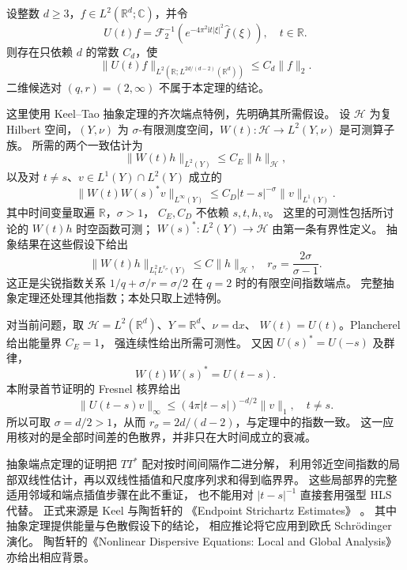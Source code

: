 \begin{theorem}\label{b2:thm:E-endpoint}
设整数 \(d\ge3\)，\(f\in L^2(\mathbb R^d;\mathbb C)\)，并令
\[
 U(t)f=\mathcal F_2^{-1}
       \left(e^{-4\pi^2\mathrm it|\xi|^2}\widehat f(\xi)\right),
 \quad t\in\mathbb R.
\]
则存在只依赖 \(d\) 的常数 \(C_d\)，使
\[
 \|U(t)f\|_{L^2(\mathbb R;L^{2d/(d-2)}(\mathbb R^d))}
 \le C_d\|f\|_2.
\]
二维候选对 \((q,r)=(2,\infty)\) 不属于本定理的结论。
\end{theorem}
\begin{proofsketch}
这里使用 Keel--Tao 抽象定理的齐次端点特例，先明确其所需假设。
设 \(\mathcal H\) 为复 Hilbert 空间，\((Y,\nu)\) 为
\(\sigma\)-有限测度空间，\(W(t):\mathcal H\to L^2(Y,\nu)\) 是可测算子族。
所需的两个一致估计为
\[
 \|W(t)h\|_{L^2(Y)}\le C_E\|h\|_{\mathcal H},
\]
以及对 \(t\ne s\)、\(v\in L^1(Y)\cap L^2(Y)\) 成立的
\[
 \|W(t)W(s)^*v\|_{L^\infty(Y)}
 \le C_D|t-s|^{-\sigma}\|v\|_{L^1(Y)}.
\]
其中时间变量取遍 \(\mathbb R\)，\(\sigma>1\)，
\(C_E,C_D\) 不依赖 \(s,t,h,v\)。
这里的可测性包括所讨论的 \(W(t)h\) 时空函数可测；
\(W(s)^*:L^2(Y)\to\mathcal H\) 由第一条有界性定义。
抽象结果在这些假设下给出
\[
 \|W(t)h\|_{L^2_tL^{r_\sigma}(Y)}
 \le C\|h\|_{\mathcal H},
 \quad r_\sigma=\frac{2\sigma}{\sigma-1}.
\]
这正是尖锐指数关系
\(1/q+\sigma/r=\sigma/2\) 在 \(q=2\) 时的有限空间指数端点。
完整抽象定理还处理其他指数；本处只取上述特例。

对当前问题，取
\(\mathcal H=L^2(\mathbb R^d)\)、\(Y=\mathbb R^d\)、\(\nu=\mathrm dx\)、
\(W(t)=U(t)\)。Plancherel 给出能量界 \(C_E=1\)，
强连续性给出所需可测性。
又因 \(U(s)^*=U(-s)\) 及群律，
\[
 W(t)W(s)^*=U(t-s).
\]
本附录首节证明的 Fresnel 核界给出
\[
 \|U(t-s)v\|_\infty
 \le(4\pi|t-s|)^{-d/2}\|v\|_1,
 \quad t\ne s.
\]
所以可取 \(\sigma=d/2>1\)，从而
\(r_\sigma=2d/(d-2)\)，与定理中的指数一致。
这一应用核对的是全部时间差的色散界，并非只在大时间成立的衰减。

抽象端点定理的证明把 \(TT^*\) 配对按时间间隔作二进分解，
利用邻近空间指数的局部双线性估计，再以双线性插值和尺度序列求和得到临界界。
这些局部界的完整适用邻域和端点插值步骤在此不重证，
也不能用对 \(|t-s|^{-1}\) 直接套用强型 HLS 代替。
正式来源是 Keel 与陶哲轩的
《Endpoint Strichartz Estimates》
\cite[Theorem 1.2, p.~956; Corollary 1.4, p.~958; Sections 4--6]{Keel1998Endpoint}。
其中抽象定理提供能量与色散假设下的结论，
相应推论将它应用到欧氏 Schrödinger 演化。
陶哲轩的《Nonlinear Dispersive Equations: Local and Global Analysis》
\cite[Section 2.3]{Tao2006Nonlinear}亦给出相应背景。
\end{proofsketch}

